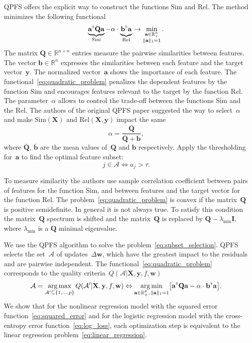 \documentclass[a4paper,12pt]{article}
\theoremstyle{plain} %
\theoremstyle{definition} %
\theoremstyle{remark} %
\newcommand{\ba}{\mathbf{a}}
\newcommand{\bb}{\mathbf{b}}
\newcommand{\bw}{\mathbf{w}}
\newcommand{\by}{\mathbf{y}}
\newcommand{\cA}{\mathcal{A}}
\newcommand{\bQ}{\mathbf{Q}}
\newcommand{\bbR}{\mathbb{R}}
\newcommand{\bX}{\mathbf{X}}
\newcommand{\T}{{\text{\tiny\sffamily\upshape\mdseries T}}}
\newcommand{\argmin}{\mathop{\arg \min}\limits}
\newcommand{\argmax}{\mathop{\arg \max}\limits}
\begin{document}
	QPFS offers the explicit way to construct the functions Sim and Rel. 
	The method minimizes the following functional
	\begin{equation}
	\underbrace{\ba^{\T} \bQ \ba}_{\text{Sim}} - \alpha \cdot \underbrace{\vphantom{()} \mathbf{b}^{\T} \ba}_{\text{Rel}} \rightarrow \min_{\substack{\ba \in \bbR^n_+ \\ \|\ba\|_1=1}}.
	\label{eq:quadratic_problem}
	\end{equation}
	The matrix $\bQ \in \bbR^{n \times n}$ entries measure the pairwise similarities between features. 
	The vector $\mathbf{b} \in \bbR^n$ expresses the similarities between each feature and the target vector~$\by$.
	The normalized vector~$\ba$ shows the importance of each feature. 
	The functional~\eqref{eq:quadratic_problem} penalizes the dependent features by the function Sim and encourages features relevant to the target by the function Rel. 
	The parameter~$\alpha$ allows to control the trade-off between the functions Sim and the Rel.
	The authors of the original QPFS paper suggested the way to select~$\alpha$ and make $\text{Sim}(\bX)$ and $\text{Rel}(\bX, \by)$ impact the same
	\begin{equation*}
	\alpha = \frac{\overline{\bQ}}{\overline{\bQ} + \overline{\bb}},
	\end{equation*}
	where $\overline{\bQ}$, $\overline{\bb}$ are the mean values of~$\bQ$ and $\bb$ respectively.
	Apply the thresholding for~$\ba$ to find the optimal feature subset:
	\[
	j \in \mathcal{A} \Leftrightarrow a_j > \tau.
	\]
	
	To measure similarity the authors use sample correlation coefficient between pairs of features for the function Sim, and between features and the target vector for the function Rel.
	The problem~\eqref{eq:quadratic_problem} is convex if the matrix~$\bQ$ is positive semidefinite. In general it is not always true. 
	To satisfy this condition the matrix~$\bQ$ spectrum is shifted and the matrix~$\bQ$ is replaced by $\bQ - \lambda_{\text{min}} \mathbf{I}$, where $\lambda_{\text{min}} $ is a $\bQ$ minimal eigenvalue.
	
	We use the QPFS algorithm to solve the problem~\eqref{eq:subset_selection}.
	QPFS selects the set~$\cA$ of updates~$\Delta \bw$, which have the greatest impact to the residuals and are pairwise independent.
	The functional~\eqref{eq:quadratic_problem} corresponds to the quality criteria~$Q(\cA | \bX, \by, f, \bw)$
	\begin{equation}
		\cA = \argmax_{\cA' \subseteq \{1, \dots, p\}} Q(\cA' | \bX, \by, f, \bw) \Leftrightarrow \argmin_{\ba  \in \bbR^p_+, \, \|\ba\|_1=1} \bigl[\ba^{\T} \bQ \ba - \alpha \cdot \mathbf{b}^{\T} \ba \bigr].
	\end{equation}
	We show that for the nonlinear regression model with the squared error function~\eqref{eq:squared_error} and for the logistic regression model with the cross-entropy error function~\eqref{eq:log_loss}, each optimization step is equivalent to the linear regression problem~\eqref{eq:linear_regression}.
	
\end{document}
